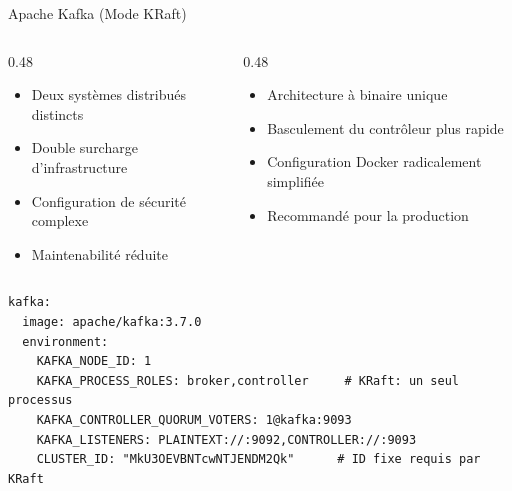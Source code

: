 \documentclass[aspectratio=169]{beamer}
\begin{document}
\begin{frame}[fragile]{Apache Kafka (Mode KRaft)}
  \begin{columns}[T]
    \begin{column}{0.48\textwidth}
      \begin{tcolorbox}[badcard, title={\sout{Ancien~: Kafka + Zookeeper}}]
        \begin{itemize}
          \item Deux systèmes distribués distincts
          \item Double surcharge d'infrastructure
          \item Configuration de sécurité complexe
          \item Maintenabilité réduite
        \end{itemize}
      \end{tcolorbox}
    \end{column}
    \begin{column}{0.48\textwidth}
      \begin{tcolorbox}[goodcard, title={\faCheckCircle\ Nouveau~: Kafka KRaft}]
        \begin{itemize}
          \item Architecture à binaire unique
          \item Basculement du contrôleur plus rapide
          \item Configuration Docker radicalement simplifiée
          \item Recommandé pour la production
        \end{itemize}
      \end{tcolorbox}
    \end{column}
  \end{columns}

  \vspace{0.3cm}
  \begin{tcolorbox}[codebox]
\begin{verbatim}
kafka:
  image: apache/kafka:3.7.0
  environment:
    KAFKA_NODE_ID: 1
    KAFKA_PROCESS_ROLES: broker,controller     # KRaft: un seul processus
    KAFKA_CONTROLLER_QUORUM_VOTERS: 1@kafka:9093
    KAFKA_LISTENERS: PLAINTEXT://:9092,CONTROLLER://:9093
    CLUSTER_ID: "MkU3OEVBNTcwNTJENDM2Qk"      # ID fixe requis par KRaft
\end{verbatim}
  \end{tcolorbox}
\end{frame}
\end{document}
